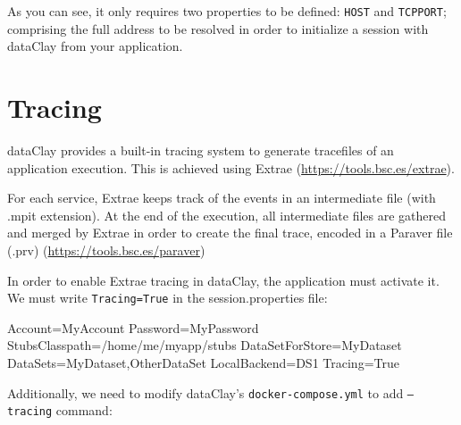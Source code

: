 As you can see, it only requires two properties to be defined: \texttt{HOST} and \texttt{TCPPORT}; comprising the full address to be resolved in order to initialize a session with dataClay from your application.

\section{Tracing}

dataClay provides a built-in tracing system to generate tracefiles of an application execution. 
This is achieved using Extrae (\href {https://tools.bsc.es/extrae} {https://tools.bsc.es/extrae}).

For each service, Extrae keeps track of the events in an intermediate file (with .mpit extension). At the end of the execution, all intermediate
files are gathered and merged by Extrae in order to create the final
trace, encoded in a Paraver file (.prv) (\href {https://tools.bsc.es/paraver} {https://tools.bsc.es/paraver})

In order to enable Extrae tracing in dataClay, the application must activate it. We must write \texttt{Tracing=True} in the  session.properties file:

\begin{tBox}
 \begin{bash}
  Account=MyAccount
  Password=MyPassword
  StubsClasspath=/home/me/myapp/stubs
  DataSetForStore=MyDataset
  DataSets=MyDataset,OtherDataSet
  LocalBackend=DS1
  Tracing=True
 \end{bash}
\end{tBox}

Additionally, we need to modify dataClay's \texttt{docker-compose.yml} to add \texttt{--tracing} command: 

